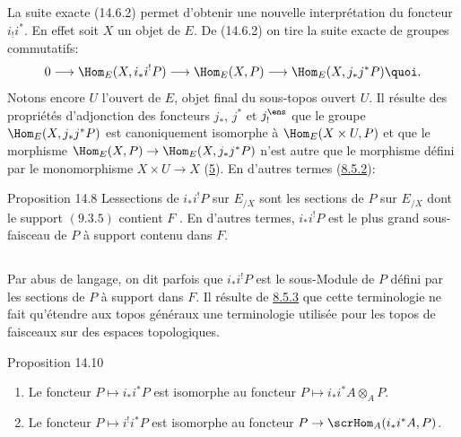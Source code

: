 \documentclass[10pt]{../fichiers-configuration-latex/smfart}
\begin{document}
\subsection{}
La suite exacte (14.6.2) permet d'obtenir une nouvelle
interprétation du foncteur $i_{!}i^{\ast}$. En effet soit $X$ un
objet de $E$. De (14.6.2) on tire la suite exacte de groupes
commutatifs:
$$
0\longrightarrow \Hom_E(X,i_{\ast}i^{!}P)\longrightarrow
\Hom_E(X,P)\longrightarrow \Hom_E(X,j_{\ast}j^{\ast}P){\quoi}.
$$
Notons encore $U$ l'ouvert de $E$, objet final du sous-topos ouvert
$U$. Il résulte des propriétés d'adjonction des foncteurs
$j_{\ast}$, $j^{\ast}$ et $j_{!}^{\ens}$ que le groupe
$\Hom_E(X,j_{\ast}j^{\ast}P)$ est canoniquement isomorphe à
$\Hom_E(X\times U,P)$ et que le morphisme $\Hom_E(X,P)\rightarrow
\Hom_E(X,j_{\ast}j^{\ast}P)$ n'est autre que le morphisme défini par
le monomorphisme $X\times U\rightarrow X$ (\hyperref[IV.sec5]{5}). En
d'autres termes (\hyperref[IV.subsubsec8.5.2]{8.5.2}):

\begin{enonce*}{Proposition 14.8}
Les\pageoriginale sections de $i_{\ast}i^{!}P$ sur $E_{/X}$ sont les
sections de $P$ sur $E_{/X}$ dont le support
$(\hyperref[IV.subsubsec9.3.5]{9.3.5})$ contient $F$ . En
d'autres termes, $i_{\ast}i^{!}P$ est le plus grand sous-faisceau de
$P$ à support contenu dans $F$.
\end{enonce*}

\setcounter{subsection}{8}
\subsection{}
Par abus de langage, on dit parfois que $i_{\ast}i^{!}P$ est le
sous-Module de $P$ défini par les sections de $P$ à support dans
$F$. Il résulte de \hyperref[IV.rem8.5.3]{8.5.3} que cette terminologie ne fait
qu'étendre aux topos généraux une terminologie
utilisée pour les
topos de faisceaux sur des espaces topologiques.

\begin{enonce*}{Proposition 14.10}
\begin{enumerate}
\renewcommand{\labelenumi}{\theenumi)}
\item Le foncteur $P\mapsto i_{\ast}i^{\ast}P$ est isomorphe au
foncteur $P\mapsto i_{\ast}i^{\ast}A\otimes_A P$.

\item Le foncteur $P\mapsto i^{!}i^{\ast}P$ est isomorphe au foncteur
$P\rightarrow \scrHom_A(i_{\ast}i^{\ast}A,P)$.
\end{enumerate}
\end{enonce*}
\end{document}

